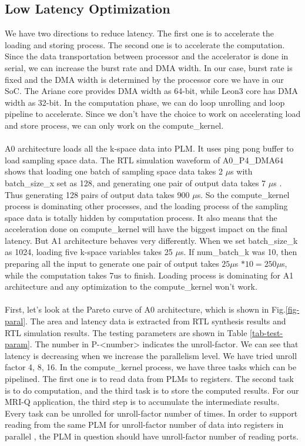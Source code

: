 \documentclass{sig-alternate}
\begin{document}
\subsection{Low Latency Optimization}
We have two directions to reduce latency. The first one is to accelerate the loading and storing process. The second one is to accelerate the computation. Since the data transportation between processor and the accelerator is done in serial, we can increase the burst rate and DMA width. In our case, burst rate is fixed and the DMA width is determined by the processor core we have in our SoC. The Ariane core provides DMA width as 64-bit, while Leon3 core has DMA width as 32-bit. In the computation phase, we can do loop unrolling and loop pipeline to accelerate. Since we don't have the choice to work on accelerating load and store process, we can only work on the compute\_kernel. \\
\\
A0 architecture loads all the k-space data into PLM. It uses ping pong buffer to load sampling space data. The RTL simulation waveform of A0\_P4\_DMA64 shows that loading one batch of sampling space data takes 2 $\mu$s with batch\_size\_x set as 128, and generating one pair of output data takes 7 $\mu$s . Thus generating 128 pairs of output data takes 900 $\mu$s. So the compute\_kernel process is dominating other processes, and the loading process of the sampling space data is totally hidden by computation process. It also means that the acceleration done on compute\_kernel will have the biggest impact on the final latency. But A1 architecture behaves very differently. When we set batch\_size\_k as 1024, loading five k-space variables takes 25 $\mu$s. If num\_batch\_k was 10, then preparing all the input to generate one pair of output takes $25\mu$s $* 10 = 250\mu$s, while the computation takes 7us to finish. Loading process is dominating for A1 architecture and any optimization to the compute\_kernel won't work. \\
\\
First, let's look at the Pareto curve of A0 architecture, which is shown in Fig.\ref{fig-paral}. The area and latency data is extracted from RTL synthesis results and RTL simulation results. The testing parameters are shown in Table \ref{tab-test-param}. The number in P-<number> indicates the unroll-factor. We can see that latency is decreasing when we increase the parallelism level. We have tried unroll factor 4, 8, 16. In the compute\_kernel process, we have three tasks which can be pipelined. The first one is to read data from PLMs to registers. The second task is to do computation, and the third task is to store the computed results. For our MRI-Q application, the third step is to accumulate the intermediate results. Every task can be unrolled for unroll-factor number of times. In order to support reading from the same PLM for unroll-factor number of data into registers in parallel , the PLM in question should have unroll-factor number of reading ports.
\end{document}
